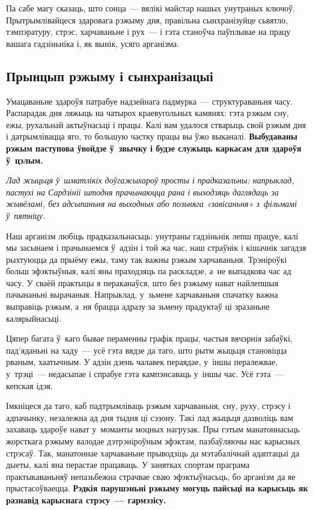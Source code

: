 Па сабе магу сказаць, што сонца~--- вялікі майстар нашых унутраных ключоў. Прытрымлівайцеся здаровага рэжыму дня, правільна сынхранізуйце сьвятло, тэмпэратуру, стрэс, харчаваньне і рух~--- і гэта станоўча паўплывае на працу вашага гадзіньніка і, як вынік, усяго арганізма.

\subsection*{Прынцып рэжыму і сынхранізацыі}

Умацаваньне здароўя патрабуе надзейнага падмурка~--- структураваньня часу. Распарадак дня ляжыць на чатырох краевугольных камянях: гэта рэжым сну, ежы, рухальнай актыўнасьці і працы. Калі вам удалося стварыць свой рэжым дня і датрымлівацца яго, то большую частку працы вы ўжо выканалі. \textbf{Выбудаваны рэжым паступова ўвойдзе ў~звычку і будзе служыць каркасам для здароўя ў~цэлым.}

\emph{Лад жыцьця ў~шматлікіх доўгажыхароў просты і прадказальны: напрыклад, пастухі на Сардзініі штодня прачынаюцца рана і выходзяць даглядаць за жывёламі, без адсыпаньня на выходных або позьняга «завісаньня» з~фільмамі ў~пятніцу.}

Наш арганізм любіць прадказальнасьць: унутраны гадзіньнік лепш працуе, калі мы засынаем і прачынаемся ў~адзін і той жа час, наш страўнік і кішачнік загадзя рыхтуюцца да прыёму ежы, таму так важны рэжым харчаваньня. Трэніроўкі больш эфэктыўныя, калі яны праходзяць па раскладзе, а~не выпадкова час ад часу. У сваёй практыцы я пераканаўся, што без рэжыму нават найлепшыя пачынаньні вырачаныя. Напрыклад, у~зьмене харчаваньня спачатку важна выправіць рэжым, а~ня брацца адразу за зьмену прадуктаў ці зразаньне калярыйнасьці.

Цяпер багата ў~каго бывае пераменны графік працы, частыя вячэрнія забаўкі, пад'яданьні на хаду~--- усё гэта вядзе да таго, што рытм жыцьця становіцца рваным, хаатычным. У адзін дзень чалавек пераядае, у~іншы пералежвае, у~трэці~--- недасыпае і спрабуе гэта кампэнсаваць у~іншы час. Усё гэта~--- кепская ідэя. 

Імкніцеся да таго, каб падтрымліваць рэжым харчаваньня, сну, руху, стрэсу і адпачынку, незалежна ад дня тыдня ці сэзону. Такі лад жыцьця дазволіць вам захаваць здароўе нават у~моманты моцных нагрузак. Пры гэтым манатоннасьць жорсткага рэжыму валодае дэтрэніроўным эфэктам, пазбаўляючы нас карысных стрэсаў. Так, манатоннае харчаваньне прыводзіць да мэтабалічнай адаптацыі да дыеты, калі яна перастае працаваць. У занятках спортам праграма практыкаваньняў непазьбежна страчвае сваю эфэктыўнасьць, бо арганізм да яе прыстасоўваецца. \textbf{Рэдкія парушэньні рэжыму могуць пайсьці на карысьць як разнавід карыснага стрэсу~--- гармэзісу.}


